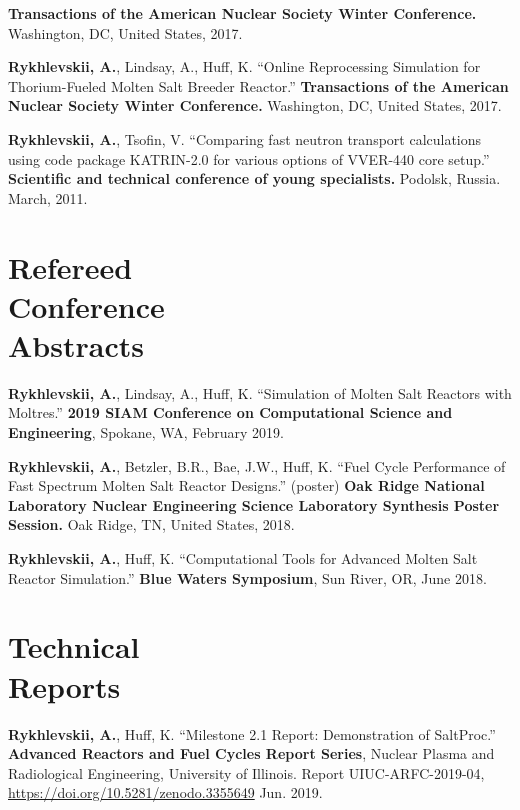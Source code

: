 \documentclass[margin,line]{resume}
\begin{document}
\begin{resume}
\begin{bibenum}
            \textbf{Transactions of the American Nuclear Society Winter Conference.} 
            Washington, DC, United States, 2017.
    \item \textbf{Rykhlevskii, A.}, Lindsay, A., Huff, K. ``Online Reprocessing Simulation for Thorium-Fueled Molten Salt Breeder Reactor.'' 
            \textbf{Transactions of the American Nuclear Society Winter Conference.} 
            Washington, DC, United States, 2017.
      \item \textbf{Rykhlevskii, A.}, Tsofin, V. ``Comparing fast neutron transport calculations using code package KATRIN-2.0 for various options of VVER-440 core setup.''
         \textbf{Scientific and technical conference of young specialists.}
         Podolsk, Russia. March, 2011.
	\end{bibenum}
    \section{\mysidestyle Refereed\\Conference\\Abstracts}
    \begin{bibenum} 
    \item \textbf{Rykhlevskii, A.}, Lindsay, A., Huff, K. ``Simulation of Molten Salt Reactors with Moltres.'' \textbf{2019 SIAM Conference on Computational Science and Engineering}, 
            Spokane, WA, February 2019.
	\item \textbf{Rykhlevskii, A.}, Betzler, B.R., Bae, J.W., Huff, K. ``Fuel Cycle Performance of Fast Spectrum Molten Salt Reactor Designs.'' (poster)
            \textbf{Oak Ridge National Laboratory Nuclear Engineering Science Laboratory Synthesis Poster Session.} 
            Oak Ridge, TN, United States, 2018.
    \item \textbf{Rykhlevskii, A.}, Huff, K. ``Computational Tools for Advanced 
            Molten Salt Reactor Simulation.'' \textbf{Blue Waters Symposium}, 
            Sun River, OR, June 2018.
	\end{bibenum}
\section{\mysidestyle Technical\\Reports}
\begin{bibenum} 
	\item \textbf{Rykhlevskii, A.}, Huff, K. ``Milestone 2.1 Report: 
	Demonstration of 
	SaltProc.'' \textbf{Advanced Reactors and Fuel Cycles Report Series}, 
	Nuclear Plasma and Radiological Engineering, University of Illinois.  
	Report UIUC-ARFC-2019-04, \url{https://doi.org/10.5281/zenodo.3355649}  
	Jun. 2019.  
\end{bibenum}

\end{resume}
\end{document}
